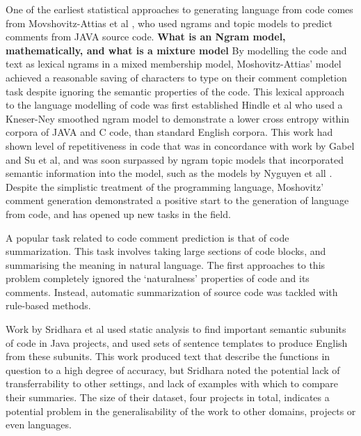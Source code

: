 One of the earliest statistical approaches to generating language from code comes from Movshovitz-Attias et al \cite{movshovitz-attias_natural_nodate}, who used ngrams and topic models to predict comments from JAVA source code.
\textbf{What is an Ngram model, mathematically, and what is a mixture model}
By modelling the code and text as lexical ngrams in a mixed membership model, Moshovitz-Attias' model achieved a reasonable saving of characters to type on their comment completion task despite ignoring the semantic properties of the code.
This lexical approach to the language modelling of code was first established Hindle et al \cite{hindle_naturalness_nodate} who used a Kneser-Ney smoothed ngram model to demonstrate a lower cross entropy within corpora of JAVA and C code, than standard English corpora. This work had shown level of repetitiveness in code that was in concordance with work by Gabel and Su et al\cite{gabel_study_2010}, and was soon surpassed by ngram topic models that incorporated semantic information into the model, such as the models by Nyguyen et all \cite{nguyen_statistical_2013}.
Despite the simplistic treatment of the programming language, Moshovitz' comment generation demonstrated a positive start to the generation of language from code, and has opened up new tasks in the field.


A popular task related to code comment prediction is that of code summarization. 
This task involves taking large sections of code blocks, and summarising the meaning in natural language. 
The first approaches to this problem completely ignored the `naturalness' properties of code and its comments.  
Instead, automatic summarization of source code was tackled with rule-based methods. 

Work by Sridhara et al \cite{sridhara_[not_2010}  used static analysis to find important semantic subunits of code in Java projects, and used sets of sentence templates to produce English from these subunits.
This work produced text that describe the functions in question to a high degree of accuracy, but Sridhara noted the potential lack of transferrability to other settings, and lack of examples with which to compare their summaries.  
The size of their dataset, four projects in total, indicates a potential problem in the generalisability of the work to other domains, projects or even languages.

